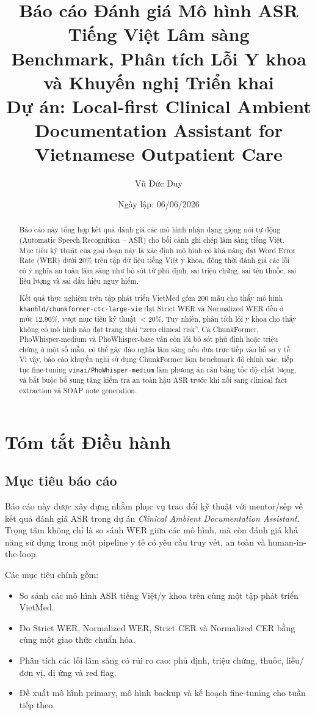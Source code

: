 \documentclass[12pt,a4paper]{article}
\title{
    \textbf{Báo cáo Đánh giá Mô hình ASR Tiếng Việt Lâm sàng}\\
    \large Benchmark, Phân tích Lỗi Y khoa và Khuyến nghị Triển khai\\
    \normalsize Dự án: Local-first Clinical Ambient Documentation Assistant for Vietnamese Outpatient Care
}
\author{Vũ Đức Duy}
\date{Ngày lập: 06/06/2026}
\begin{document}
\maketitle

\begin{abstract}
Báo cáo này tổng hợp kết quả đánh giá các mô hình nhận dạng giọng nói tự động (Automatic Speech Recognition -- ASR) cho bối cảnh ghi chép lâm sàng tiếng Việt. Mục tiêu kỹ thuật của giai đoạn này là xác định mô hình có khả năng đạt Word Error Rate (WER) dưới 20\% trên tập dữ liệu tiếng Việt y khoa, đồng thời đánh giá các lỗi có ý nghĩa an toàn lâm sàng như bỏ sót từ phủ định, sai triệu chứng, sai tên thuốc, sai liều lượng và sai dấu hiệu nguy hiểm.

Kết quả thực nghiệm trên tập phát triển VietMed gồm 200 mẫu cho thấy mô hình \texttt{khanhld/chunkformer-ctc-large-vie} đạt Strict WER và Normalized WER đều ở mức 12.90\%, vượt mục tiêu kỹ thuật $<20\%$. Tuy nhiên, phân tích lỗi y khoa cho thấy không có mô hình nào đạt trạng thái ``zero clinical risk''. Cả ChunkFormer, PhoWhisper-medium và PhoWhisper-base vẫn còn lỗi bỏ sót phủ định hoặc triệu chứng ở một số mẫu, có thể gây đảo nghĩa lâm sàng nếu đưa trực tiếp vào hồ sơ y tế. Vì vậy, báo cáo khuyến nghị sử dụng ChunkFormer làm benchmark độ chính xác, tiếp tục fine-tuning \texttt{vinai/PhoWhisper-medium} làm phương án cân bằng tốc độ--chất lượng, và bắt buộc bổ sung tầng kiểm tra an toàn hậu ASR trước khi nối sang clinical fact extraction và SOAP note generation.
\end{abstract}

\tableofcontents
\newpage

\section{Tóm tắt Điều hành}

\subsection{Mục tiêu báo cáo}

Báo cáo này được xây dựng nhằm phục vụ trao đổi kỹ thuật với mentor/sếp về kết quả đánh giá ASR trong dự án \textit{Clinical Ambient Documentation Assistant}. Trọng tâm không chỉ là so sánh WER giữa các mô hình, mà còn đánh giá khả năng sử dụng trong một pipeline y tế có yêu cầu truy vết, an toàn và human-in-the-loop.

Các mục tiêu chính gồm:
\begin{itemize}[leftmargin=1.2cm]
    \item So sánh các mô hình ASR tiếng Việt/y khoa trên cùng một tập phát triển VietMed.
    \item Đo Strict WER, Normalized WER, Strict CER và Normalized CER bằng cùng một giao thức chuẩn hóa.
    \item Phân tích các lỗi lâm sàng có rủi ro cao: phủ định, triệu chứng, thuốc, liều/đơn vị, dị ứng và red flag.
    \item Đề xuất mô hình primary, mô hình backup và kế hoạch fine-tuning cho tuần tiếp theo.
\end{itemize}
\end{document}
